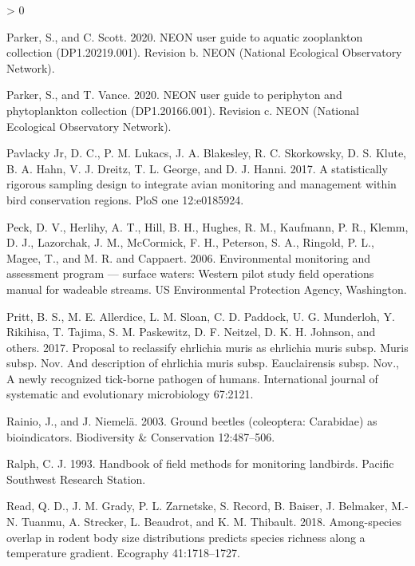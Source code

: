 \documentclass[
  12pt,
]{article}
\newlength{\cslhangindent}
\newenvironment{CSLReferences}[2] %
 {%
  \setlength{\parindent}{0pt}
  \ifodd #1 \everypar{\setlength{\hangindent}{\cslhangindent}}\ignorespaces\fi
  \ifnum #2 > 0
  \setlength{\parskip}{#2\baselineskip}
  \fi
 }%
 {}
\begin{document}
\begin{CSLReferences}{1}{0}
\leavevmode\hypertarget{ref-ParkerScott2020}{}%
Parker, S., and C. Scott. 2020. NEON user guide to aquatic zooplankton collection (DP1.20219.001). Revision b. NEON (National Ecological Observatory Network).

\leavevmode\hypertarget{ref-ParkerVance2020}{}%
Parker, S., and T. Vance. 2020. NEON user guide to periphyton and phytoplankton collection (DP1.20166.001). Revision c. NEON (National Ecological Observatory Network).

\leavevmode\hypertarget{ref-pavlacky2017statistically}{}%
Pavlacky Jr, D. C., P. M. Lukacs, J. A. Blakesley, R. C. Skorkowsky, D. S. Klute, B. A. Hahn, V. J. Dreitz, T. L. George, and D. J. Hanni. 2017. A statistically rigorous sampling design to integrate avian monitoring and management within bird conservation regions. PloS one 12:e0185924.

\leavevmode\hypertarget{ref-peck2006environmental}{}%
Peck, D. V., Herlihy, A. T., Hill, B. H., Hughes, R. M., Kaufmann, P. R., Klemm, D. J., Lazorchak, J. M., McCormick, F. H., Peterson, S. A., Ringold, P. L., Magee, T., and M. R. and Cappaert. 2006. Environmental monitoring and assessment program --- surface waters: Western pilot study field operations manual for wadeable streams. US Environmental Protection Agency, Washington.

\leavevmode\hypertarget{ref-pritt2017proposal}{}%
Pritt, B. S., M. E. Allerdice, L. M. Sloan, C. D. Paddock, U. G. Munderloh, Y. Rikihisa, T. Tajima, S. M. Paskewitz, D. F. Neitzel, D. K. H. Johnson, and others. 2017. Proposal to reclassify ehrlichia muris as ehrlichia muris subsp. Muris subsp. Nov. And description of ehrlichia muris subsp. Eauclairensis subsp. Nov., A newly recognized tick-borne pathogen of humans. International journal of systematic and evolutionary microbiology 67:2121.

\leavevmode\hypertarget{ref-rainio2003ground}{}%
Rainio, J., and J. Niemelä. 2003. Ground beetles (coleoptera: Carabidae) as bioindicators. Biodiversity \& Conservation 12:487--506.

\leavevmode\hypertarget{ref-ralph1993handbook}{}%
Ralph, C. J. 1993. Handbook of field methods for monitoring landbirds. Pacific Southwest Research Station.

\leavevmode\hypertarget{ref-read2018among}{}%
Read, Q. D., J. M. Grady, P. L. Zarnetske, S. Record, B. Baiser, J. Belmaker, M.-N. Tuanmu, A. Strecker, L. Beaudrot, and K. M. Thibault. 2018. Among-species overlap in rodent body size distributions predicts species richness along a temperature gradient. Ecography 41:1718--1727.


\end{CSLReferences}
\end{document}
